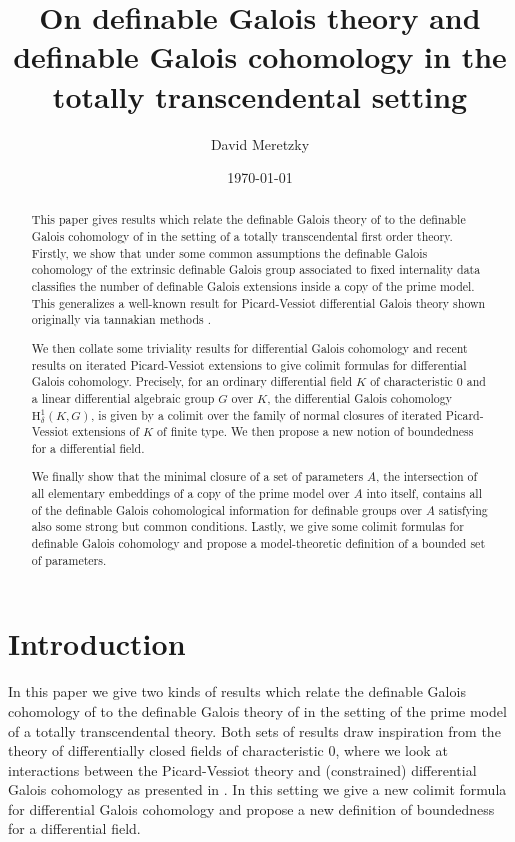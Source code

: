 \documentclass{amsart}
\title[Definable Galois cohomology]{On definable Galois theory and definable Galois cohomology in the totally transcendental setting}
\author{David Meretzky}
\date{\today}
\theoremstyle{definition}
\theoremstyle{remark}
\numberwithin{equation}{section}
\begin{document}
\begin{abstract}
    	This paper gives results which relate the definable Galois theory of \cite{OmarAnand} to the definable Galois cohomology of \cite{pillay1997} in the setting of a totally transcendental first order theory. Firstly, we show that under some common assumptions the definable Galois cohomology of the extrinsic definable Galois group associated to fixed internality data classifies the number of definable Galois extensions inside a copy of the prime model. This generalizes a well-known result for Picard-Vessiot differential Galois theory shown originally via tannakian methods \cite{DeligneMilne2022}. 

        We then collate some triviality results for differential Galois cohomology \cite{PILLAY2017809} and recent results on iterated Picard-Vessiot extensions \cite{magid2022completepicardvessiotclosure} \cite{meretzky2026galoistheoryautomorphismgroups} to give colimit formulas for differential Galois cohomology. Precisely, for an ordinary differential field $K$ of characteristic $0$ and a linear differential algebraic group $G$ over $K$, the differential Galois cohomology $\text{H}^1_{\delta}(K,G)$, is given by a colimit over the family of normal closures of iterated Picard-Vessiot extensions of $K$ of finite type.  We then propose a new notion of boundedness for a differential field.
        
        We finally show that the minimal closure of a set of parameters $A$, the intersection of all elementary embeddings of a copy of the prime model over $A$ into itself, contains all of the definable Galois cohomological information for definable groups over $A$ satisfying also some strong but common conditions. Lastly, we give some colimit formulas for definable Galois cohomology and propose a model-theoretic definition of a bounded set of parameters. 
\end{abstract}

\maketitle

\section{Introduction}

In this paper we give two kinds of results which relate the definable Galois cohomology of \cite{pillay1997} to the definable Galois theory of \cite{OmarAnand} in the setting of the prime model of a totally transcendental theory. Both sets of results draw inspiration from the theory of differentially closed fields of characteristic $0$, where we look at interactions between the Picard-Vessiot theory and (constrained) differential Galois cohomology as presented in \cite{kolchin1985differential}. In this setting we give a new colimit formula for differential Galois cohomology and propose a new definition of boundedness for a differential field.  
\end{document}
